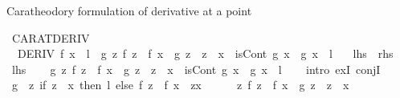 \begin{isabellebody}
\begin{isamarkuptext}
Caratheodory formulation of derivative at a point%
\end{isamarkuptext}\isamarkuptrue%
\isamarkupfalse%
\ CARAT{\isacharunderscore}{\kern0pt}DERIV{\isacharcolon}{\kern0pt}\isanewline
\ \ {\isachardoublequoteopen}{\isacharparenleft}{\kern0pt}DERIV\ f\ x\ {\isacharcolon}{\kern0pt}{\isachargreater}{\kern0pt}\ l{\isacharparenright}{\kern0pt}\ {\isasymlongleftrightarrow}\ {\isacharparenleft}{\kern0pt}{\isasymexists}g{\isachardot}{\kern0pt}\ {\isacharparenleft}{\kern0pt}{\isasymforall}z{\isachardot}{\kern0pt}\ f\ z\ {\isacharminus}{\kern0pt}\ f\ x\ {\isacharequal}{\kern0pt}\ g\ z\ {\isacharasterisk}{\kern0pt}\ {\isacharparenleft}{\kern0pt}z\ {\isacharminus}{\kern0pt}\ x{\isacharparenright}{\kern0pt}{\isacharparenright}{\kern0pt}\ {\isasymand}\ isCont\ g\ x\ {\isasymand}\ g\ x\ {\isacharequal}{\kern0pt}\ l{\isacharparenright}{\kern0pt}{\isachardoublequoteclose}\isanewline
\ \ {\isacharparenleft}{\kern0pt}\ {\isachardoublequoteopen}{\isacharquery}{\kern0pt}lhs\ {\isacharequal}{\kern0pt}\ {\isacharquery}{\kern0pt}rhs{\isachardoublequoteclose}{\isacharparenright}{\kern0pt}\isanewline
%
\isadelimproof
%
\endisadelimproof
%
\isatagproof
{}\isamarkupfalse%
\isanewline
\ \ \isamarkupfalse%
\ {\isacharquery}{\kern0pt}lhs\isanewline
\ \ \isamarkupfalse%
\ {\isachardoublequoteopen}{\isasymexists}g{\isachardot}{\kern0pt}\ {\isacharparenleft}{\kern0pt}{\isasymforall}z{\isachardot}{\kern0pt}\ f\ z\ {\isacharminus}{\kern0pt}\ f\ x\ {\isacharequal}{\kern0pt}\ g\ z\ {\isacharasterisk}{\kern0pt}\ {\isacharparenleft}{\kern0pt}z\ {\isacharminus}{\kern0pt}\ x{\isacharparenright}{\kern0pt}{\isacharparenright}{\kern0pt}\ {\isasymand}\ isCont\ g\ x\ {\isasymand}\ g\ x\ {\isacharequal}{\kern0pt}\ l{\isachardoublequoteclose}\isanewline
\ \ \isamarkupfalse%
\ {\isacharparenleft}{\kern0pt}intro\ exI\ conjI{\isacharparenright}{\kern0pt}\isanewline
\ \ \ \ \isamarkupfalse%
\ {\isacharquery}{\kern0pt}g\ {\isacharequal}{\kern0pt}\ {\isachardoublequoteopen}{\isacharparenleft}{\kern0pt}{\isasymlambda}z{\isachardot}{\kern0pt}\ if\ z\ {\isacharequal}{\kern0pt}\ x\ then\ l\ else\ {\isacharparenleft}{\kern0pt}f\ z\ {\isacharminus}{\kern0pt}\ f\ x{\isacharparenright}{\kern0pt}\ {\isacharslash}{\kern0pt}\ {\isacharparenleft}{\kern0pt}z{\isacharminus}{\kern0pt}x{\isacharparenright}{\kern0pt}{\isacharparenright}{\kern0pt}{\isachardoublequoteclose}\isanewline
\ \ \ \ \isamarkupfalse%
\ {\isachardoublequoteopen}{\isasymforall}z{\isachardot}{\kern0pt}\ f\ z\ {\isacharminus}{\kern0pt}\ f\ x\ {\isacharequal}{\kern0pt}\ {\isacharquery}{\kern0pt}g\ z\ {\isacharasterisk}{\kern0pt}\ {\isacharparenleft}{\kern0pt}z\ {\isacharminus}{\kern0pt}\ x{\isacharparenright}{\kern0pt}{\isachardoublequoteclose}\isanewline

\end{isabellebody}
